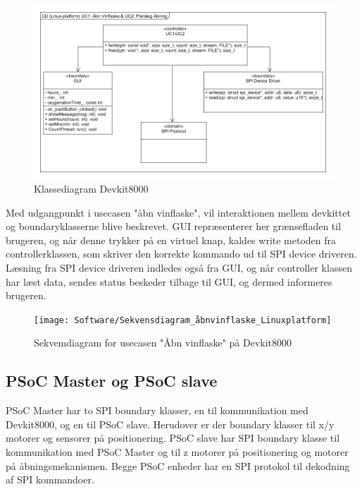 \begin{figure}[H]
\includegraphics[scale=0.8]{Software/Klassediagram_Linuxplatform}
\caption{Klassediagram Devkit8000}
\end{figure}

Med udgangpunkt i usecasen "åbn vinflaske", vil interaktionen mellem devkittet og boundaryklasserne blive beskrevet. 
GUI repræsenterer her grænsefladen til brugeren, og når denne trykker på en virtuel knap, kaldes write metoden fra controllerklassen, som skriver den korrekte 
kommando ud til SPI device driveren. Læsning fra SPI device driveren indledes også fra GUI, og når controller klassen har læst data, sendes status beskeder 
tilbage til GUI, og dermed informeres brugeren.

\begin{figure}[H]
\texttt{[image: Software/Sekvensdiagram\_åbnvinflaske\_Linuxplatform]}
\caption{Sekvemdiagram for usecasen "Åbn vinflaske" på Devkit8000}
\end{figure}

\subsection{PSoC Master og PSoC slave}

PSoC Master har to SPI boundary klasser, en til kommunikation med Devkit8000, og en til PSoC slave. Herudover er der boundary klasser til x/y motorer og 
sensorer på positionering. 
PSoC slave har SPI boundary klasse til kommunikation med PSoC Master og til z motorer på positionering og motorer på åbningsmekanismen. Begge PSoC enheder har
en SPI protokol til dekodning af SPI kommandoer.

